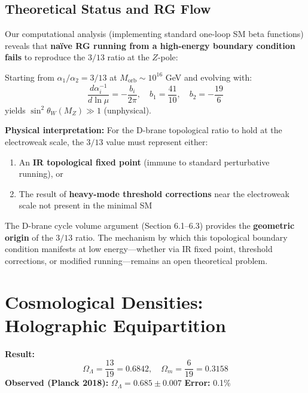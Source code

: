 \documentclass[12pt,a4paper]{article}
\newcommand{\OmegaL}{\Omega_\Lambda}
\newcommand{\OmegaM}{\Omega_m}
\newcommand{\sinW}{\sin^2\theta_W}
\begin{document}
\subsection{Theoretical Status and RG Flow}

\begin{tcolorbox}[colback=yellow!10!white, colframe=orange!75!black, title=Epistemic Caveat: RG Flow Analysis]
Our computational analysis (implementing standard one-loop SM beta functions) reveals that \textbf{na\"ive RG running from a high-energy boundary condition fails} to reproduce the $3/13$ ratio at the $Z$-pole:

Starting from $\alpha_1/\alpha_2 = 3/13$ at $M_{\text{orb}} \sim 10^{16}$ GeV and evolving with:
\begin{equation}
\frac{d\alpha_i^{-1}}{d\ln\mu} = -\frac{b_i}{2\pi}, \quad b_1 = \frac{41}{10}, \quad b_2 = -\frac{19}{6}
\end{equation}
yields $\sinW(M_Z) \gg 1$ (unphysical).

\textbf{Physical interpretation:} For the D-brane topological ratio to hold at the electroweak scale, the $3/13$ value must represent either:
\begin{enumerate}
    \item An \textbf{IR topological fixed point} (immune to standard perturbative running), or
    \item The result of \textbf{heavy-mode threshold corrections} near the electroweak scale not present in the minimal SM
\end{enumerate}

The D-brane cycle volume argument (Section 6.1--6.3) provides the \textbf{geometric origin} of the $3/13$ ratio. The mechanism by which this topological boundary condition manifests at low energy---whether via IR fixed point, threshold corrections, or modified running---remains an open theoretical problem.
\end{tcolorbox}

\section{Cosmological Densities: Holographic Equipartition}
\label{sec:cosmo}

\begin{derivedbox}
\textbf{Result:}
\begin{equation}
\OmegaL = \frac{13}{19} = 0.6842, \quad \OmegaM = \frac{6}{19} = 0.3158
\end{equation}
\textbf{Observed (Planck 2018):} $\OmegaL = 0.685 \pm 0.007$ \quad \textbf{Error:} 0.1\%
\end{derivedbox}
\end{document}
